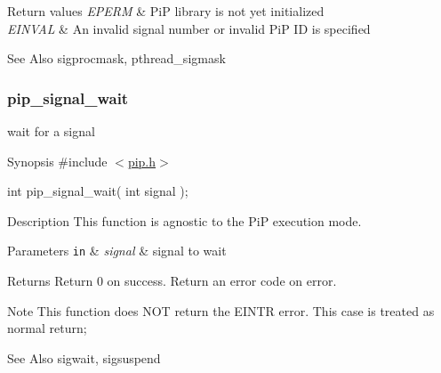 \begin{DoxyRetVals}{Return values}
{\em E\-P\-E\-R\-M} & Pi\-P library is not yet initialized \\
\hline
{\em E\-I\-N\-V\-A\-L} & An invalid signal number or invalid Pi\-P I\-D is specified\\
\hline
\end{DoxyRetVals}
\begin{DoxySeeAlso}{See Also}
sigprocmask, pthread\-\_\-sigmask 
\end{DoxySeeAlso}
\hypertarget{pip_signal_wait}{}\subsubsection{pip\-\_\-signal\-\_\-wait}\label{pip_signal_wait}
wait for a signal

\begin{DoxyParagraph}{Synopsis}
\#include $<$\hyperlink{pip_8h_source}{pip.\-h}$>$ \par
int pip\-\_\-signal\-\_\-wait( int signal );
\end{DoxyParagraph}
\begin{DoxyParagraph}{Description}
This function is agnostic to the Pi\-P execution mode.
\end{DoxyParagraph}

\begin{DoxyParams}[1]{Parameters}
\mbox{\tt in}  & {\em signal} & signal to wait\\
\hline
\end{DoxyParams}
\begin{DoxyReturn}{Returns}
Return 0 on success. Return an error code on error.
\end{DoxyReturn}
\begin{DoxyNote}{Note}
This function does N\-O\-T return the {\ttfamily E\-I\-N\-T\-R} error. This case is treated as normal return;
\end{DoxyNote}
\begin{DoxySeeAlso}{See Also}
sigwait, sigsuspend 
\end{DoxySeeAlso}
